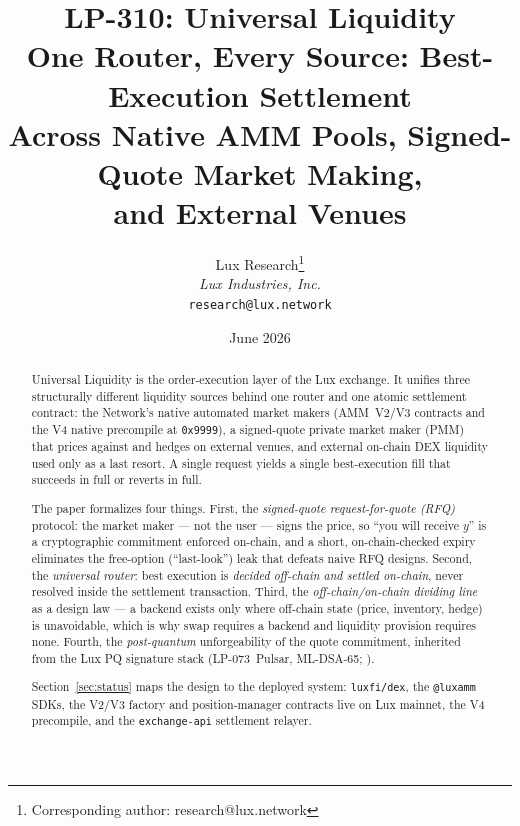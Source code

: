 \documentclass[11pt,a4paper]{article}
\title{LP-310: Universal Liquidity\\[4pt]
\large One Router, Every Source: Best-Execution Settlement\\
Across Native AMM Pools, Signed-Quote Market Making,\\
and External Venues}
\author{
Lux Research\thanks{Corresponding author: research@lux.network}\\
\textit{Lux Industries, Inc.}\\
\texttt{research@lux.network}
}
\date{June 2026}
\begin{document}
\luxcoverpage

\begin{abstract}
Universal Liquidity is the order-execution layer of the Lux exchange.
It unifies three structurally different liquidity sources behind one
router and one atomic settlement contract: the Network's native
automated market makers (AMM~V2/V3 contracts and the V4 native
precompile at \texttt{0x9999}), a signed-quote private market maker
(PMM) that prices against and hedges on external venues, and external
on-chain DEX liquidity used only as a last resort. A single request
yields a single best-execution fill that succeeds in full or reverts
in full.

The paper formalizes four things. First, the \emph{signed-quote
request-for-quote (RFQ)} protocol: the market maker --- not the user
--- signs the price, so ``you will receive $y$'' is a cryptographic
commitment enforced on-chain, and a short, on-chain-checked expiry
eliminates the free-option (``last-look'') leak that defeats naive
RFQ designs. Second, the \emph{universal router}: best execution is
\emph{decided off-chain and settled on-chain}, never resolved inside
the settlement transaction. Third, the \emph{off-chain/on-chain
dividing line} as a design law --- a backend exists only where
off-chain state (price, inventory, hedge) is unavoidable, which is
why swap requires a backend and liquidity provision requires none.
Fourth, the \emph{post-quantum} unforgeability of the quote
commitment, inherited from the Lux PQ signature stack
(LP-073~Pulsar, ML-DSA-65; \cite{lp073,lp020}).

Section~\ref{sec:status} maps the design to the deployed system:
\texttt{luxfi/dex}, the \texttt{@luxamm} SDKs, the V2/V3 factory and
position-manager contracts live on Lux mainnet, the V4 precompile,
and the \texttt{exchange-api} settlement relayer.
\end{abstract}

\tableofcontents
\newpage










\end{document}
